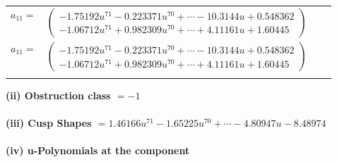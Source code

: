 \documentclass[1p]{elsarticle_modified}
\theoremstyle{definition}
\begin{document}
\begin{tabular}{m{7pt} m{180pt} m{7pt} m{180pt} }
\flushright $a_{11}=$&$\begin{pmatrix}-1.75192 u^{71}-0.223371 u^{70}+\cdots-10.3144 u+0.548362\\-1.06712 u^{71}+0.982309 u^{70}+\cdots+4.11161 u+1.60445\end{pmatrix}$\\ \flushright $a_{11}=$&$\begin{pmatrix}-1.75192 u^{71}-0.223371 u^{70}+\cdots-10.3144 u+0.548362\\-1.06712 u^{71}+0.982309 u^{70}+\cdots+4.11161 u+1.60445\end{pmatrix}$\\&\end{tabular}
\flushleft \textbf{(ii) Obstruction class $= -1$}\\~\\
\flushleft \textbf{(iii) Cusp Shapes $= 1.46166 u^{71}-1.65225 u^{70}+\cdots-4.80947 u-8.48974$}\\~\\
\newpage\renewcommand{\arraystretch}{1}
\flushleft \textbf{(iv) u-Polynomials at the component}\newline \\
\end{document}
